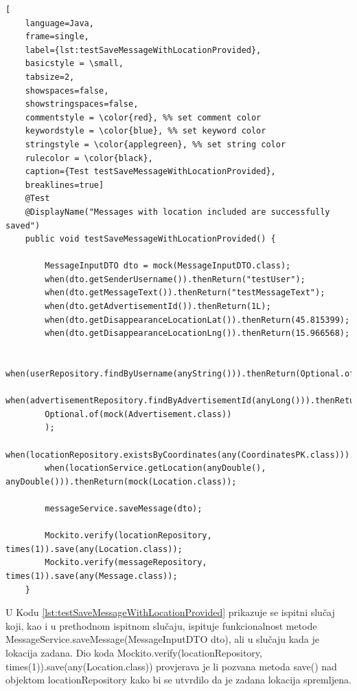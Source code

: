 \begin{lstlisting}[
	language=Java,
	frame=single,
	label={lst:testSaveMessageWithLocationProvided},
	basicstyle = \small,
	tabsize=2,
	showspaces=false,
	showstringspaces=false,
	commentstyle = \color{red}, %% set comment color
	keywordstyle = \color{blue}, %% set keyword color
	stringstyle = \color{applegreen}, %% set string color
	rulecolor = \color{black},
	caption={Test testSaveMessageWithLocationProvided},
	breaklines=true]
	@Test
	@DisplayName("Messages with location included are successfully saved")
	public void testSaveMessageWithLocationProvided() {
		
		MessageInputDTO dto = mock(MessageInputDTO.class);
		when(dto.getSenderUsername()).thenReturn("testUser");
		when(dto.getMessageText()).thenReturn("testMessageText");
		when(dto.getAdvertisementId()).thenReturn(1L);
		when(dto.getDisappearanceLocationLat()).thenReturn(45.815399);
		when(dto.getDisappearanceLocationLng()).thenReturn(15.966568);
		
		when(userRepository.findByUsername(anyString())).thenReturn(Optional.of(mock(User.class)));
		when(advertisementRepository.findByAdvertisementId(anyLong())).thenReturn(
		Optional.of(mock(Advertisement.class))
		);
		when(locationRepository.existsByCoordinates(any(CoordinatesPK.class))).thenReturn(false);
		when(locationService.getLocation(anyDouble(), anyDouble())).thenReturn(mock(Location.class));
		
		messageService.saveMessage(dto);
		
		Mockito.verify(locationRepository, times(1)).save(any(Location.class));
		Mockito.verify(messageRepository, times(1)).save(any(Message.class));
	}
\end{lstlisting}

U Kodu \ref{lst:testSaveMessageWithLocationProvided} prikazuje se ispitni slučaj koji, kao i u prethodnom ispitnom slučaju, ispituje funkcionalnost metode MessageService.saveMessage(MessageInputDTO dto), ali u slučaju kada je lokacija zadana. Dio koda Mockito.verify(locationRepository, times(1)).save(any(Location.class)) provjerava je li pozvana metoda save() nad objektom locationRepository kako bi se utvrdilo da je zadana lokacija spremljena.

\pagebreak

